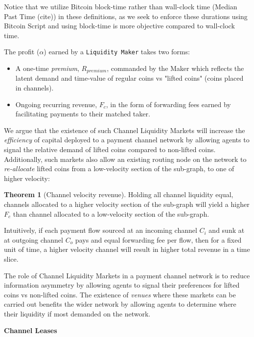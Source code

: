 \documentclass[10pt,a4paper]{article}
\theoremstyle{definition}
\newtheorem{theorem}{Theorem}[section]
\begin{document}
Notice that we utilize Bitcoin block-time rather than wall-clock time (Median Past
Time (cite)) in these definitions, as we seek to enforce these durations using
Bitcoin Script and using block-time is more objective compared to wall-clock time. 

The profit ($\alpha$) earned by a \texttt{Liquidity Maker} takes two forms: 
\begin{itemize}
   \item A one-time \emph{premium}, $R_{premium}$, commanded by the Maker which
       reflects the latent demand and time-value of regular coins vs "lifted
       coins" (coins placed in channels). 

   \item Ongoing recurring revenue, $F_c$,  in the form of forwarding fees
       earned by facilitating payments to their matched taker. 
\end{itemize} 


We argue that the existence of such Channel Liquidity Markets will increase the
\emph{efficiency} of capital deployed to a payment channel network by allowing
agents to signal the relative demand of lifted coins compared to non-lifted
coins. Additionally, such markets also allow an existing routing node on the
network to \emph{re-allocate} lifted coins from a low-velocity section of the
sub-graph, to one of higher velocity: 

\begin{theorem}[Channel velocity revenue] %
Holding all channel liquidity equal, channels allocated to a higher velocity
section of the sub-graph will yield a higher $F_c$  than channel allocated to a
low-velocity section of the sub-graph. 
\end{theorem}

Intuitively, if each payment flow sourced at an incoming channel $C_i$ and sunk
at at outgoing channel $C_o$ pays and equal forwarding fee per flow, then for a
fixed unit of time, a higher velocity channel will result in higher total
revenue in a time slice. 

The role of Channel Liquidity Markets in a payment channel network is to reduce
information asymmetry by allowing agents to signal their preferences for lifted
coins vs non-lifted coins. The existence of \emph{venues} where these markets
can be carried out benefits the wider network by allowing agents to determine
where their liquidity if most demanded on the network. %

\begin{center}
\textbf{Channel Leases}
\end{center}
\end{document}
